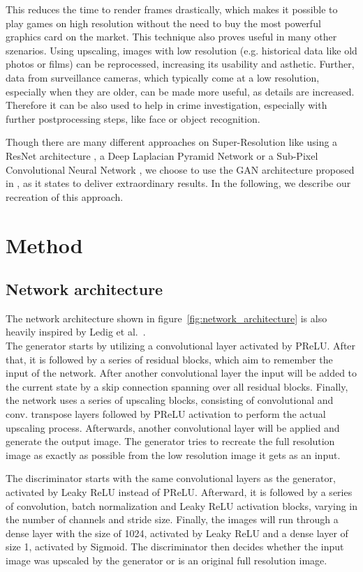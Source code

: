 \documentclass[11pt,twocolumn,twoside,paper=a4]{IEEEtran}
\begin{document}
This reduces the time to render frames drastically, which makes it possible to play games on high resolution without the need to buy the most powerful graphics card on the market. 
This technique also proves useful in many other szenarios.
Using upscaling, images with low resolution (e.g. historical data like old photos or films) can be reprocessed, increasing its usability and asthetic.
Further, data from surveillance cameras, which typically come at a low resolution, especially when they are older, can be made more useful, as details are increased. Therefore it can be also used to help in crime investigation, especially with further postprocessing steps, like face or object recognition.

Though there are many different approaches on Super-Resolution like using a ResNet architecture \cite{lim2017enhanced}, a Deep Laplacian Pyramid Network \cite{lai2018fast} or a Sub-Pixel Convolutional Neural Network \cite{shi2016real}, we choose to use the GAN architecture proposed in \cite{DBLP:journals/corr/LedigTHCATTWS16}, as it states to deliver extraordinary results.
In the following, we describe our recreation of this approach.

\section{Method}
\subsection{Network architecture}
The network architecture shown in figure~\ref{fig:network_architecture} is also heavily inspired by Ledig et al.~\cite{DBLP:journals/corr/LedigTHCATTWS16}.\\
The generator starts by utilizing a convolutional layer activated by PReLU. 
After that, it is followed by a series of residual blocks, 
which aim to remember the input of the network. 
After another convolutional layer the input will be added to the current state by a skip connection spanning over all residual blocks. 
Finally, the network uses a series of upscaling blocks, consisting of convolutional and conv. transpose layers followed by PReLU activation to perform the actual upscaling process. 
Afterwards, another convolutional layer will be applied and generate the output image. The generator tries to recreate the full resolution image as exactly as possible from the low resolution image it gets as an input.

The discriminator starts with the same convolutional layers as the generator, activated by Leaky ReLU instead of PReLU. 
Afterward, it is followed by a series of convolution, batch normalization and Leaky ReLU activation blocks, varying in the number of channels and stride size. 
Finally, the images will run through a dense layer with the size of 1024, activated by Leaky ReLU and a dense layer of size 1, activated by Sigmoid. 
The discriminator then decides whether the input image was upscaled by the generator or is an original full resolution image.
\end{document}
